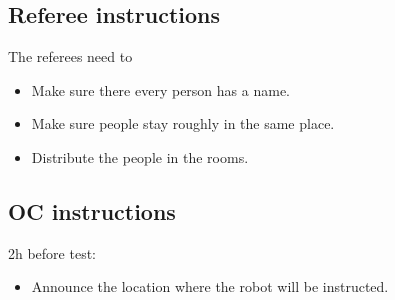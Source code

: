 \subsection{Referee instructions}

The referees need to
\begin{itemize}
	\item Make sure there every person has a name.
	\item Make sure people stay roughly in the same place.
	\item Distribute the people in the rooms.
\end{itemize}

\subsection{OC instructions}

2h before test:
\begin{itemize}
	\item Announce the location where the robot will be instructed.
\end{itemize}

% 
